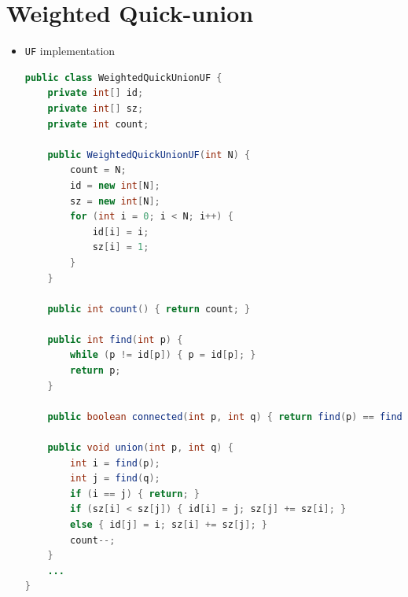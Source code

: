 \documentclass[8pt,a4paper,compress]{beamer}
\begin{document}
\section{Weighted Quick-union}
\begin{frame}[fragile]
\begin{itemize}
\item \lstinline{UF} implementation
\begin{lstlisting}[language=Java]
public class WeightedQuickUnionUF {
    private int[] id; 
    private int[] sz; 
    private int count; 

    public WeightedQuickUnionUF(int N) {
        count = N;
        id = new int[N];
        sz = new int[N];
        for (int i = 0; i < N; i++) {
            id[i] = i;
            sz[i] = 1;
        }
    }

    public int count() { return count; }

    public int find(int p) {
        while (p != id[p]) { p = id[p]; }
        return p;
    }

    public boolean connected(int p, int q) { return find(p) == find(q); }

    public void union(int p, int q) {
        int i = find(p);
        int j = find(q);
        if (i == j) { return; }
        if (sz[i] < sz[j]) { id[i] = j; sz[j] += sz[i]; }
        else { id[j] = i; sz[i] += sz[j]; }
        count--;
    }
    ...
}
\end{lstlisting}
\end{itemize}
\end{frame}
\end{document}
